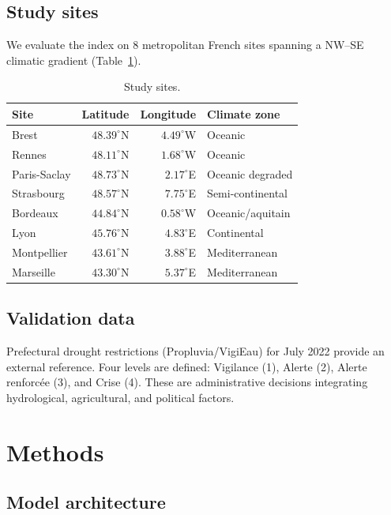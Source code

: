 \documentclass[11pt,a4paper]{article}
\begin{document}
\subsection{Study sites}

We evaluate the index on 8 metropolitan French sites spanning a NW--SE climatic gradient (Table~\ref{tab:sites}).

\begin{table}[h]
\centering
\small
\caption{Study sites.}
\label{tab:sites}
\begin{tabular}{lrrl}
\toprule
Site & Latitude & Longitude & Climate zone \\
\midrule
Brest         & $48.39^\circ$N & $4.49^\circ$W & Oceanic \\
Rennes        & $48.11^\circ$N & $1.68^\circ$W & Oceanic \\
Paris-Saclay  & $48.73^\circ$N & $2.17^\circ$E & Oceanic degraded \\
Strasbourg    & $48.57^\circ$N & $7.75^\circ$E & Semi-continental \\
Bordeaux      & $44.84^\circ$N & $0.58^\circ$W & Oceanic/aquitain \\
Lyon          & $45.76^\circ$N & $4.83^\circ$E & Continental \\
Montpellier   & $43.61^\circ$N & $3.88^\circ$E & Mediterranean \\
Marseille     & $43.30^\circ$N & $5.37^\circ$E & Mediterranean \\
\bottomrule
\end{tabular}
\end{table}

\subsection{Validation data}

Prefectural drought restrictions (Propluvia/VigiEau) for July 2022 provide an external reference. Four levels are defined: Vigilance (1), Alerte (2), Alerte renforcée (3), and Crise (4). These are administrative decisions integrating hydrological, agricultural, and political factors.

\section{Methods}

\subsection{Model architecture}
\end{document}
